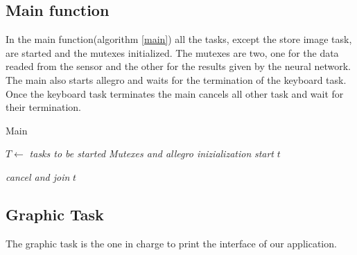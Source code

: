 \documentclass[12pt]{article}
\begin{document}
\subsection{Main function}
In the main function(algorithm \ref{main}) all the tasks, except the store image task, are started
and the mutexes initialized. The mutexes are two, one for the data readed
from the sensor and the other for the results given by the neural network. 
The main also starts allegro and waits for the termination of the keyboard task.
Once the keyboard task terminates the main cancels all other task and wait for
their termination.

\begin{algorithm}[t]
\caption{Main}
\label{main}

\begin{algorithmic}
\State $T\gets$ \textit{tasks to be started}
\State \textit{Mutexes and allegro inizialization}
    \State \textit{start} $t$
\EndFor

\EndLoop

    \State \textit{cancel and join} $t$
\EndFor

\end{algorithmic}
\end{algorithm}

\subsection{Graphic Task}

The graphic task is the one in charge to print the interface of our application.
\end{document}

